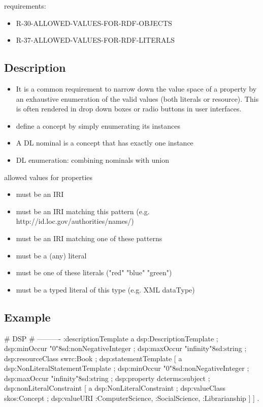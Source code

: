 \documentclass{llncs}
\begin{document}
requirements:

\begin{itemize}
	\item R-30-ALLOWED-VALUES-FOR-RDF-OBJECTS
  \item R-37-ALLOWED-VALUES-FOR-RDF-LITERALS
\end{itemize}

\subsection{Description}

\begin{itemize}
  \item It is a common requirement to narrow down the value space of a property by an exhaustive enumeration of the valid values (both literals or resource). This is often rendered in drop down boxes or radio buttons in user interfaces. 
	\item define a concept by simply enumerating its instances
	\item A DL nominal is a concept that has exactly one instance
	\item DL enumeration: combining nominals with union
\end{itemize}

allowed values for properties

\begin{itemize}
	\item must be an IRI
  \item must be an IRI matching this pattern (e.g. http://id.loc.gov/authorities/names/)
  \item must be an IRI matching one of these patterns
  \item must be a (any) literal
  \item must be one of these literals ("red" "blue" "green")
  \item must be a typed literal of this type (e.g. XML dataType)
\end{itemize}

\subsection{Example}

\begin{ex}
# DSP
# ----------
:descriptionTemplate 
    a dsp:DescriptionTemplate ;
    dsp:minOccur "0"^^xsd:nonNegativeInteger ; 
    dsp:maxOccur "infinity"^^xsd:string ; 
    dsp:resourceClass swrc:Book ; 
    dsp:statementTemplate [
        a dsp:NonLiteralStatementTemplate ;
        dsp:minOccur "0"^^xsd:nonNegativeInteger ; 
        dsp:maxOccur "infinity"^^xsd:string ; 
        dsp:property dcterms:subject ; 
        dsp:nonLiteralConstraint [ 
            a dsp:NonLiteralConstraint ;
            dsp:valueClass skos:Concept ;
            dsp:valueURI :ComputerScience, :SocialScience, :Librarianship ] ] .
\end{ex}
\end{document}
